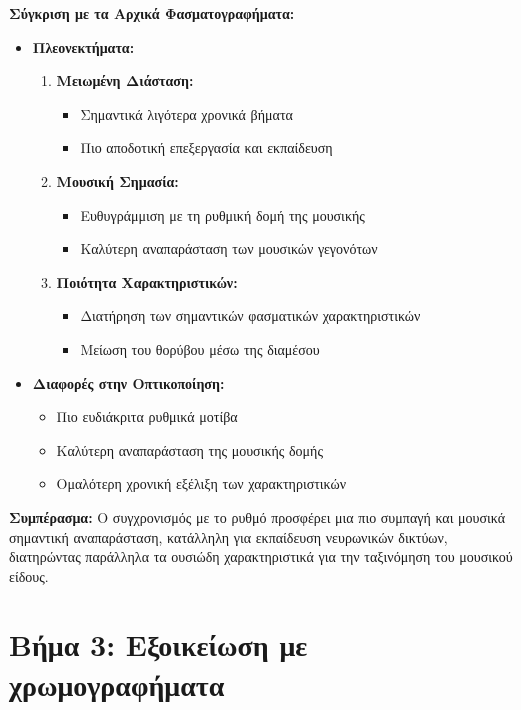 \documentclass[a4paper,12pt]{article}
\begin{document}
\textbf{Σύγκριση με τα Αρχικά Φασματογραφήματα:}
\begin{itemize}
   \item \textbf{Πλεονεκτήματα:}
   \begin{enumerate}
       \item \textbf{Μειωμένη Διάσταση:}
       \begin{itemize}
           \item Σημαντικά λιγότερα χρονικά βήματα
           \item Πιο αποδοτική επεξεργασία και εκπαίδευση
       \end{itemize}
       
       \item \textbf{Μουσική Σημασία:}
       \begin{itemize}
           \item Ευθυγράμμιση με τη ρυθμική δομή της μουσικής
           \item Καλύτερη αναπαράσταση των μουσικών γεγονότων
       \end{itemize}
       
       \item \textbf{Ποιότητα Χαρακτηριστικών:}
       \begin{itemize}
           \item Διατήρηση των σημαντικών φασματικών χαρακτηριστικών
           \item Μείωση του θορύβου μέσω της διαμέσου
       \end{itemize}
   \end{enumerate}
   
   \item \textbf{Διαφορές στην Οπτικοποίηση:}
   \begin{itemize}
       \item Πιο ευδιάκριτα ρυθμικά μοτίβα
       \item Καλύτερη αναπαράσταση της μουσικής δομής
       \item Ομαλότερη χρονική εξέλιξη των χαρακτηριστικών
   \end{itemize}
\end{itemize}

\textbf{Συμπέρασμα:}
Ο συγχρονισμός με το ρυθμό προσφέρει μια πιο συμπαγή και μουσικά σημαντική αναπαράσταση, κατάλληλη για εκπαίδευση νευρωνικών δικτύων, διατηρώντας παράλληλα τα ουσιώδη χαρακτηριστικά για την ταξινόμηση του μουσικού είδους.

\section*{Βήμα 3: Εξοικείωση με χρωμογραφήματα}
\end{document}
